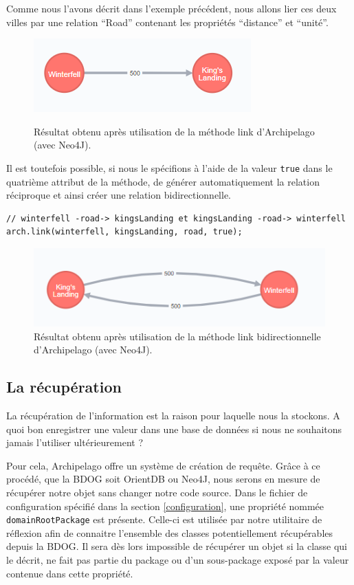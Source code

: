 \documentclass[a4paper,fleqn,12pt,oneside]{book}
\begin{document}
Comme nous l'avons décrit dans l'exemple précédent, nous allons lier ces deux villes par une relation \enquote{Road} contenant les propriétés \enquote{distance} et \enquote{unité}.

\begin{figure}[!ht]
\centering
\includegraphics[scale=1.2]{figures/Rel.png}
\label{fig:Relation}
\caption{Résultat obtenu après utilisation de la méthode link d'Archipelago (avec Neo4J).}
\end{figure}

Il est toutefois possible, si nous le spécifions à l'aide de la valeur \texttt{true} dans le quatrième attribut de la méthode, de générer automatiquement la relation réciproque et ainsi créer une relation bidirectionnelle. 

\begin{lstlisting}
// winterfell -road-> kingsLanding et kingsLanding -road-> winterfell
arch.link(winterfell, kingsLanding, road, true);
\end{lstlisting}


\begin{figure}[!ht]
\centering
\includegraphics[scale=1.2]{figures/RelBidir.png}
\caption{Résultat obtenu après utilisation de la méthode link bidirectionnelle d'Archipelago (avec Neo4J).}
\label{fig:RelationBiDir}
\end{figure}
\newpage
\subsection{La récupération}
\label{récupération}
La récupération de l'information est la raison pour laquelle nous la stockons. A quoi bon enregistrer une valeur dans une base de données si nous ne souhaitons jamais l'utiliser ultérieurement ?

Pour cela, Archipelago offre un système de création de requête. Grâce à ce procédé, que la BDOG soit OrientDB ou Neo4J, nous serons en mesure de récupérer notre objet sans changer notre code source. Dans le fichier de configuration spécifié dans la section \ref{configuration}, une propriété nommée \texttt{domainRootPackage} est présente. Celle-ci est utilisée par notre utilitaire de réflexion afin de connaitre l'ensemble des classes potentiellement récupérables depuis la BDOG. Il sera dès lors impossible de récupérer un objet si la classe qui le décrit, ne fait pas partie du package ou d'un sous-package exposé par la valeur contenue dans cette propriété.
\end{document}

